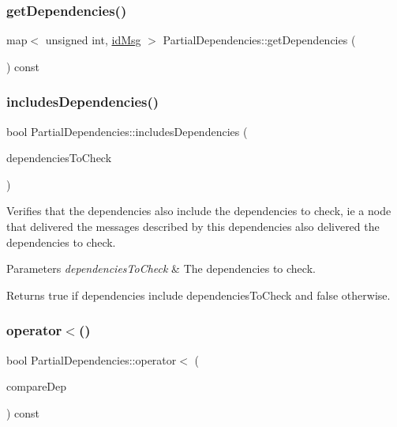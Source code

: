 \subsubsection{\texorpdfstring{get\+Dependencies()}{getDependencies()}}
{\footnotesize\ttfamily map$<$ unsigned int, \hyperlink{structures_8h_a83a1d9a070efa5341da84cfd8e28d3e5}{id\+Msg} $>$ Partial\+Dependencies\+::get\+Dependencies (\begin{DoxyParamCaption}{ }\end{DoxyParamCaption}) const}

\mbox{\label{class_partial_dependencies_a4cfd27959669b5b7b58ea07d38824d7b}} 
\subsubsection{\texorpdfstring{includes\+Dependencies()}{includesDependencies()}}
{\footnotesize\ttfamily bool Partial\+Dependencies\+::includes\+Dependencies (\begin{DoxyParamCaption}\item[{const \hyperlink{class_partial_dependencies}{Partial\+Dependencies} \&}]{dependencies\+To\+Check }\end{DoxyParamCaption})}



Verifies that the dependencies also include the dependencies to check, ie a node that delivered the messages described by this dependencies also delivered the dependencies to check. 


\begin{DoxyParams}{Parameters}
{\em dependencies\+To\+Check} & The dependencies to check. \\
\hline
\end{DoxyParams}
\begin{DoxyReturn}{Returns}
true if dependencies include dependencies\+To\+Check and false otherwise. 
\end{DoxyReturn}
\mbox{\label{class_partial_dependencies_af8f87bc4a622db0f56276502c6655f38}} 
\subsubsection{\texorpdfstring{operator$<$()}{operator<()}}
{\footnotesize\ttfamily bool Partial\+Dependencies\+::operator$<$ (\begin{DoxyParamCaption}\item[{const \hyperlink{class_partial_dependencies}{Partial\+Dependencies} \&}]{compare\+Dep }\end{DoxyParamCaption}) const}


